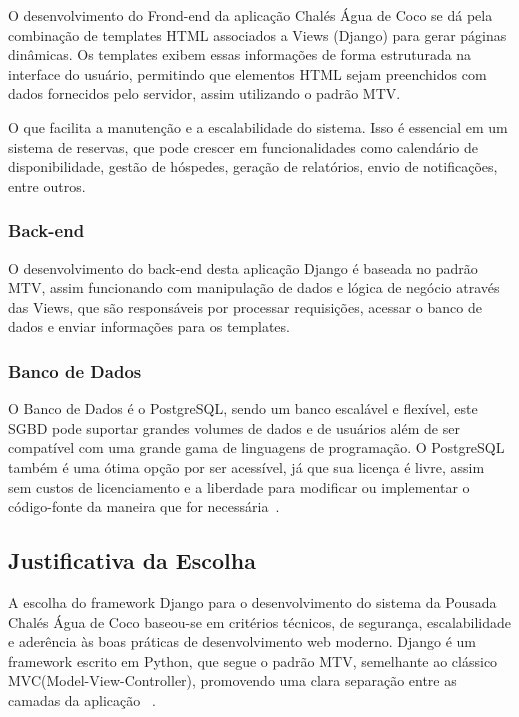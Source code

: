 \documentclass[
	12pt,				%
	openany,			%
	oneside,			%
	a4paper,			%
	english,			%
	french,				%
	spanish,			%
	brazil				%
	]{abntex2}
\begin{document}
O desenvolvimento do Frond-end da aplicação Chalés Água de Coco se dá pela combinação de templates HTML associados a Views (Django) para gerar páginas dinâmicas. Os templates exibem essas informações de forma estruturada na interface do usuário, permitindo que elementos HTML sejam preenchidos com dados fornecidos pelo servidor, assim utilizando o padrão MTV.

O que facilita a manutenção e a escalabilidade do sistema. Isso é essencial em um sistema de reservas, que pode crescer em funcionalidades como calendário de disponibilidade, gestão de hóspedes, geração de relatórios, envio de notificações, entre outros.

\subsubsection{Back-end}

O desenvolvimento do back-end desta aplicação Django é baseada no padrão MTV, assim funcionando com manipulação de dados e lógica de negócio através das Views, que são responsáveis por processar requisições, acessar o banco de dados e enviar informações para os templates.

\subsubsection{Banco de Dados}

O Banco de Dados é o PostgreSQL, sendo um banco escalável e flexível, este SGBD pode suportar grandes volumes de dados e de usuários além de ser compatível com uma grande gama de linguagens de programação.
O PostgreSQL também é uma ótima opção por ser acessível, já que sua licença é livre, assim sem custos de licenciamento e a liberdade para modificar ou implementar o código-fonte da maneira que for necessária~\cite{postgresql}.

\subsection{Justificativa da Escolha}

A escolha do framework Django para o desenvolvimento do sistema da Pousada Chalés Água de Coco baseou-se em critérios técnicos, de segurança, escalabilidade e aderência às boas práticas de desenvolvimento web moderno. Django é um framework escrito em Python, que segue o padrão MTV, semelhante ao clássico MVC(Model-View-Controller), promovendo uma clara separação entre as camadas da aplicação ~\cite{python}.
\end{document}
